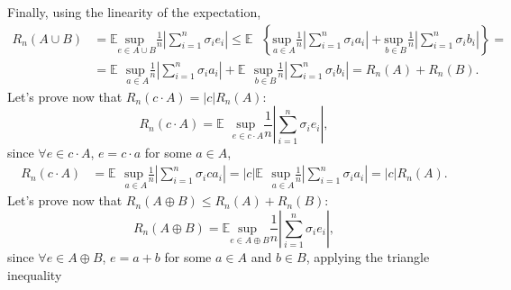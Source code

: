 \documentclass[11pt, english]{article}
\newcommand{\su}[2]{\sum\limits_{#1}^{#2}}
\begin{document}
Finally, using the linearity of the expectation,
\begin{align}
	R_n(A\cup B)&=\mathbb{E}\underset{e\in A\cup B}{\text{sup }}\frac{1}{n}\left|\su{i=1}{n}\sigma_i e_i\right|\leq\mathbb{E}\text{ }\left\{\underset{a\in A}{\text{sup }}\frac{1}{n}\left|\su{i=1}{n}\sigma_i a_i\right|+\underset{b\in B}{\text{sup }}\frac{1}{n}\left|\su{i=1}{n}\sigma_i b_i\right|\right\}=\\
	&=\mathbb{E}\text{ }\underset{a\in A}{\text{sup }}\frac{1}{n}\left|\su{i=1}{n}\sigma_i a_i\right|+\mathbb{E}\text{ }\underset{b\in B}{\text{sup }}\frac{1}{n}\left|\su{i=1}{n}\sigma_i b_i\right|=R_n(A)+R_n(B).
\end{align}
Let's prove now that $R_n(c\cdot A)=|c|R_n(A)$:
\begin{equation}
	R_n(c\cdot A)=\mathbb{E}\text{ }\underset{e\in c\cdot A}{\text{sup }}\frac{1}{n}\left|\su{i=1}{n}\sigma_i e_i\right|,
\end{equation}
since $\forall e\in c\cdot A$, $e=c\cdot a$ for some $a\in A$,
\begin{align}
	R_n(c\cdot A)& =\mathbb{E}\text{ }\underset{a\in A}{\text{sup }}\frac{1}{n}\left|\su{i=1}{n}\sigma_i ca_i\right|=|c|\mathbb{E}\text{ }\underset{a\in A}{\text{sup }}\frac{1}{n}\left|\su{i=1}{n}\sigma_i a_i\right|=|c|R_n(A).
\end{align}
Let's prove now that $R_n(A\oplus B)\leq R_n(A)+R_n(B)$:
\begin{equation}
	R_n(A\oplus B)=\mathbb{E}\underset{e\in A\oplus B}{\text{sup }}\frac{1}{n}\left|\su{i=1}{n}\sigma_i e_i\right|,
\end{equation}
since $\forall e\in A\oplus B$, $e=a+b$ for some $a\in A$ and $b\in B$, applying the triangle inequality
\end{document}
